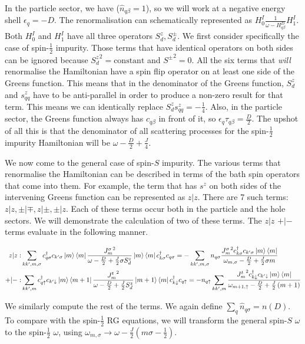\documentclass[reprint,prb,superscriptaddress]{revtex4-2}
\begin{document}
In the particle sector, we have (\(\hat n_{q\beta}=1\)), so we will work at a negative energy  shell \(\epsilon_q = -D\). The renormalisation can schematically represented as \(H^I_0 \frac{1}{\omega - H^D_{q\beta}} H^I_1\). Both \(H^I_0\) and \(H^I_1\) have all three operators \(S_d^z, S_d^\pm\). We first consider specifically the case of spin-\(\frac{1}{2}\) impurity. Those terms that have identical operators on both sides can be ignored because \({S_d^z}^2 = \text{constant}\) and \({S^\pm}^2 = 0\). All the six terms that \textit{will} renormalise the Hamiltonian have a spin flip operator on at least one side of the Greens function. This means that in the denominator of the Greens function, \(S_d^z\) and \(s^z_{qq}\) have to be anti-parallel in order to produce a non-zero result for that term. This means we can identically replace \(S_d^z s^z_{qq} = -\frac{1}{4}\). Also, in the particle sector, the Greens function always has \(c_{q\beta}\) in front of it, so \(\epsilon_q \tau_{q\beta} = \frac{D}{2}\). The upshot of all this is that the denominator of all scattering processes for the spin-\(\frac{1}{2}\) impurity Hamiltonian will be \(\omega - \frac{D}{2} + \frac{J}{4}\).

We now come to the general case of spin-\(S\) impurity. The various terms that renormalise the Hamiltonian can be described in terms of the bath spin operators that come into them. For example, the term that has \(s^z\) on both sides of the intervening Greens function can be represented as \(z|z\). There are 7 such terms: \(z|z, \pm|\mp, z|\pm, \pm|z\). Each of these terms occur both in the particle and the hole sectors. We will demonstrate the calculation of two of these terms. The \(z|z\) \(+|-\) terms evaluate in the following manner.
\begin{widetext}
\begin{align}
	z|z: & \sum_{kk^\prime,m,\sigma} c^\dagger_{q \sigma} c_{k^\prime \sigma} \ket{m}\bra{m}\frac{{J^\sigma_m}^2}{\omega - \frac{D}{2} + \frac{J}{2}\sigma S_d^z}\ket{m}\bra{m} c^\dagger_{k \sigma}c_{q \sigma} = -\sum_{kk^\prime,m,\sigma}n_{q \sigma}\frac{{J^\sigma_m}^2 c^\dagger_{k \sigma}c_{k^\prime\sigma} \ket{m}\bra{m}}{\omega_{m, \sigma} - \frac{D}{2} + \frac{J}{2}\sigma m}\\
	+|-: & \sum_{kk^\prime,m} c^\dagger_{q \uparrow} c_{k^\prime \downarrow} \ket{m}\bra{m+1}\frac{{J^t_m}^2}{\omega - \frac{D}{2} + \frac{J}{2}S_d^z}\ket{m+1}\bra{m} c^\dagger_{k \downarrow}c_{q \uparrow} = -n_{q \uparrow}\sum_{kk^\prime,m}\frac{{J^t_m}^2 c^\dagger_{k \downarrow}c_{k^\prime\downarrow} \ket{m}\bra{m}}{\omega_{m+1, \uparrow} - \frac{D}{2} + \frac{J}{2}\left( m+1 \right) }
\end{align}
\end{widetext}
We similarly compute the rest of the terms. We again define \(\sum_q \hat n_{q\sigma} = n(D)\). To compare with the spin-\(\frac{1}{2}\) RG equations, we will transform the general spin-\(S\) \(\omega\) to the spin-\(\frac{1}{2}\) \( \omega\), using \(\omega_{m,\sigma} \to \omega - \frac{J}{2}\left(m\sigma - \frac{1}{2}\right)\).
\end{document}
